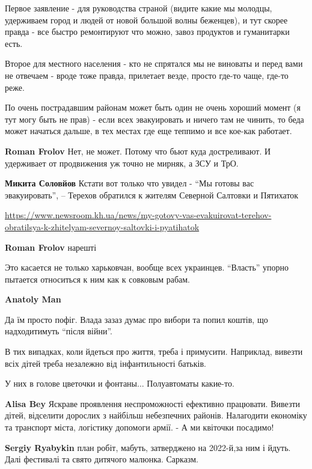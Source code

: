 \begin{itemize}
Первое заявление - для руководства страной (видите какие мы молодцы, удерживаем
город и людей от новой большой волны беженцев), и тут скорее правда - все
быстро ремонтируют что можно, завоз продуктов и гуманитарки есть.

Второе для местного населения - кто не спрятался мы не виноваты и перед вами не
отвечаем - вроде тоже правда, прилетает везде, просто где-то чаще, где-то реже.

По очень пострадавшим районам может быть один не очень хороший момент (я тут
могу быть не прав) - если всех эвакуировать и ничего там не чинить, то беда
может начаться дальше, в тех местах где еще теппимо и все кое-как работает.

\begin{itemize} %
\textbf{Roman Frolov} Нет, не может. Потому что бьют куда достреливают. И удерживает от продвижения уж точно не мирняк, а ЗСУ и ТрО.

\textbf{Микита Соловйов} Кстати вот только что увидел - \enquote{Мы готовы вас эвакуировать}, – Терехов обратился к жителям Северной Салтовки и Пятихаток 

\url{https://www.newsroom.kh.ua/news/my-gotovy-vas-evakuirovat-terehov-obratilsya-k-zhitelyam-severnoy-saltovki-i-pyatihatok}

\textbf{Roman Frolov} нарешті
\end{itemize} %

Это касается не только харьковчан, вообще всех украинцев. \enquote{Власть} упорно пытается относиться к ним как к совковым рабам.

\textbf{Anatoly Man} 

Да їм просто пофіг. Влада зазаз думає про вибори та попил коштів, що надходитимуть \enquote{після війни}.

В тих випадках, коли йдеться про життя, треба і примусити. Наприклад, вивезти
всіх дітей треба незалежно від інфантильності батьків.

У них в голове цветочки и фонтаны... Полуавтоматы какие-то.

\begin{itemize} %
\textbf{Alisa Bey} Яскраве проявлення неспроможності ефективно працювати. Вивезти дітей, відселити дорослих з найбільш небезпечних районів. Налагодити економіку та транспорт міста, логістику допомоги армії.
- А ми квіточки посадимо!

\textbf{Sergiy Ryabykin} план робіт, мабуть, затверджено на 2022-й,за ним і йдуть. Далі фестивалі та свято дитячого малюнка. Сарказм.
\end{itemize} %


\end{itemize}
